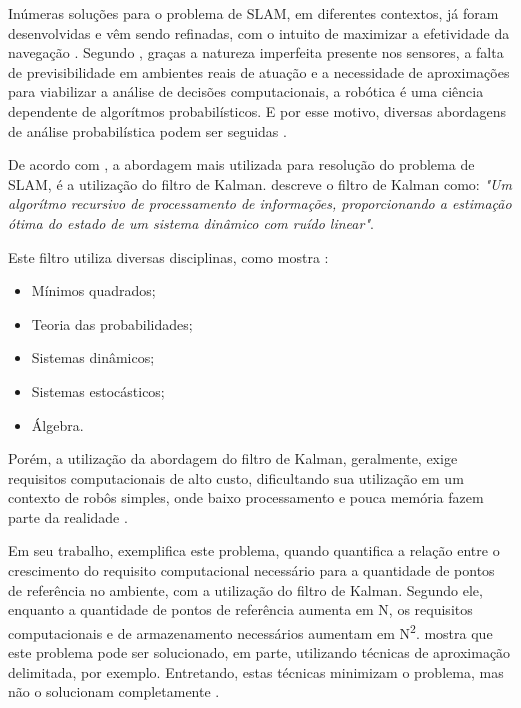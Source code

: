 Inúmeras soluções para o problema de SLAM, em diferentes contextos, já foram desenvolvidas e vêm sendo refinadas, com o intuito de maximizar a efetividade da navegação \cite{theCleaningProject}. Segundo \cite{circumventingAssociationSLAM}, graças a natureza imperfeita presente nos sensores, a falta de previsibilidade em ambientes reais de atuação e a necessidade de aproximações para viabilizar a análise de decisões computacionais, a robótica é uma ciência dependente de algorítmos probabilísticos. E por esse motivo, diversas  abordagens de análise probabilística podem ser seguidas \cite{circumventingAssociationSLAM}.

De acordo com \cite{slamProblem}, a abordagem mais utilizada para resolução do problema de SLAM, é a utilização do filtro de Kalman. \cite{theCleaningProject} descreve o filtro de Kalman como: \textit{"Um algorítmo recursivo de processamento de informações, proporcionando a estimação ótima do estado de um sistema dinâmico com ruído linear"}.

Este filtro utiliza diversas disciplinas, como mostra \cite{theCleaningProject}:
\begin{itemize}
	\item Mínimos quadrados;
	\item Teoria das probabilidades;
	\item Sistemas dinâmicos;
	\item Sistemas estocásticos;
	\item Álgebra.
\end{itemize}

Porém, a utilização da abordagem do filtro de Kalman, geralmente, exige requisitos computacionais de alto custo, dificultando sua utilização em um contexto de robôs simples, onde baixo processamento e pouca memória fazem parte da realidade \cite{agenteExploratorioKalman}.

 Em seu trabalho, \cite{slamProblem} exemplifica este problema, quando quantifica a relação entre o crescimento do requisito computacional necessário para a quantidade de pontos de referência no ambiente, com a utilização do filtro de Kalman. Segundo ele, enquanto a quantidade de pontos de referência aumenta em N, os requisitos computacionais e de armazenamento necessários aumentam em N\textsuperscript{2}. \cite{slamProblem} mostra que este problema pode ser solucionado, em parte, utilizando técnicas de aproximação delimitada, por exemplo. Entretando, estas técnicas minimizam o problema, mas não o solucionam completamente \cite{slamProblem}.

